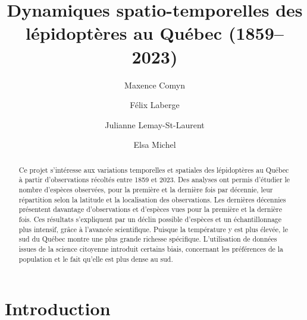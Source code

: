 \documentclass[preprint, 3p,
authoryear]{elsarticle} %
\begin{document}
\begin{frontmatter}

  \title{Dynamiques spatio-temporelles des lépidoptères au Québec
(1859--2023)}
    \author[Université de Sherbrooke]{Maxence Comyn%
  }
    \author[Université de Sherbrooke]{Félix Laberge%
  }
    \author[Université de Sherbrooke]{Julianne Lemay-St-Laurent%
  }
    \author[Université de Sherbrooke]{Elsa Michel%
  }
  
  \begin{abstract}
  Ce projet s'intéresse aux variations temporelles et spatiales des
  lépidoptères au Québec à partir d'observations récoltés entre 1859 et
  2023. Des analyses ont permis d'étudier le nombre d'espèces observées,
  pour la première et la dernière fois par décennie, leur répartition
  selon la latitude et la localisation des observations. Les dernières
  décennies présentent davantage d'observations et d'espèces vues pour
  la première et la dernière fois. Ces résultats s'expliquent par un
  déclin possible d'espèces et un échantillonnage plus intensif, grâce à
  l'avancée scientifique. Puisque la température y est plus élevée, le
  sud du Québec montre une plus grande richesse spécifique.
  L'utilisation de données issues de la science citoyenne introduit
  certains biais, concernant les préférences de la population et le fait
  qu'elle est plus dense au sud.
  \end{abstract}
  
 \end{frontmatter}

\section{Introduction}\label{introduction}
\end{document}
